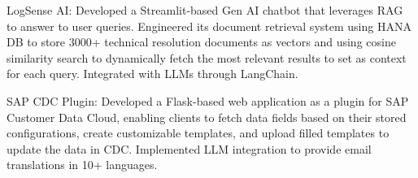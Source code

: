
   {\projectentry
    {LogSense AI:} {Developed a Streamlit-based Gen AI chatbot that leverages RAG to answer to user queries. Engineered its document retrieval system using HANA DB to store 3000+ technical resolution documents as vectors and using cosine similarity search to dynamically fetch the most relevant results to set as context for each query. Integrated with LLMs through LangChain.} 
    }

    {\projectentry
    {SAP CDC Plugin:} {Developed a Flask-based web application as a plugin for SAP Customer Data Cloud, enabling clients to fetch data fields based on their stored configurations, create customizable templates, and upload filled templates to update the data in CDC. Implemented LLM integration to provide email translations in 10+ languages.} 
    }
    